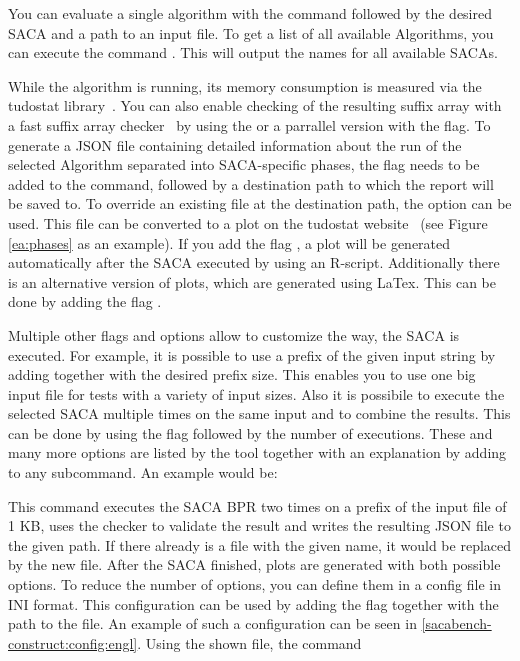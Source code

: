 You can evaluate a single algorithm with the command  followed by the desired SACA and a path to an input file.
To get a list of all available Algorithms, you can execute the command .
This will output the names for all available SACAs.

While the algorithm is running, its memory consumption is measured via the tudostat library~\cite{tudostat}.
You can also enable checking of the resulting suffix array with a fast suffix array checker~\cite{saca:11} by
using the  or a parrallel version with the  flag.
To generate a JSON file containing detailed information about the run of the selected Algorithm separated into SACA-specific phases,
the flag  needs to be added to the command, followed by a destination path to which the report will be saved to.
To override an existing file at the destination path, the option  can be used.
This file can be converted to a plot on the tudostat website~\cite{tudostat} (see Figure \ref{ea:phases} as an example).
If you add the flag , a plot will be generated automatically after the SACA executed by using an R-script.
Additionally there is an alternative version of plots, which are generated using LaTex.
This can be done by adding the flag .

Multiple other flags and options allow to customize the way, the SACA is executed.
For example, it is possible to use a prefix of the given input string by adding  together with the desired prefix size. 
This enables you to use one big input file for tests with a variety of input sizes.
Also it is possibile to execute the selected SACA multiple times on the same input and to combine the results.
This can be done by using the flag  followed by the number of executions.
These and many more options are listed by the tool together with an explanation by adding  to any subcommand.
An example would be:


This command executes the SACA BPR two times on a prefix of the input file of 1 KB, 
uses the checker to validate the result and writes the resulting JSON file to the given path.
If there already is a file with the given name, it would be replaced by the new file.
After the SACA finished, plots are generated with both possible options.
To reduce the number of options, you can define them in a config file in INI format.
This configuration can be used by adding the flag  together with the path to the file.
An example of such a configuration can be seen in \ref{sacabench-construct:config:engl}.
Using the shown file, the command 

